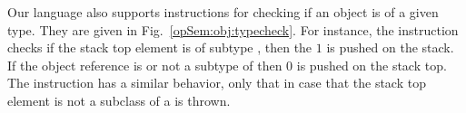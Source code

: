 Our language also supports instructions for checking if an object is of a given type. They are given in Fig.\ \ref{opSem:obj:typecheck}.
For instance, the instruction \instanceof{} checks if the stack top element is 
 of subtype \clazz{}, then the   $1$ is pushed on the stack. If 
the object reference is \Mynull or not a subtype of \clazz{} then $0$ is pushed on the stack top. 
The \checkcast{} instruction has a similar behavior, only that in case that the stack top element is not
a subclass of \clazz{} a \ClassCastExc{} is thrown.

\begin{figure}[ht!] 
\end{figure}
